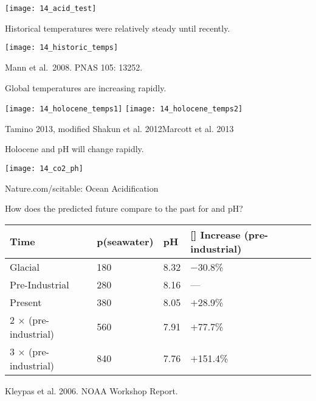 \documentclass[t,handout]{beamer}  %
\begin{document}

{
\begin{frame}
  \texttt{[image: 14\_acid\_test]}
\end{frame}
}
\begin{frame}[t]{Historical temperatures were relatively steady until recently.}

	\vspace{-\baselineskip}

	{\centering
	\texttt{[image: 14\_historic\_temps]}\par}
	
	\vfilll
	
	\tiny \hfill Mann et al.~2008. PNAS 105: 13252.  
	
\end{frame}
%
\begin{frame}[t]{Global temperatures are increasing rapidly.}
	
	\texttt{[image: 14\_holocene\_temps1]}
	\hfill
	\texttt{[image: 14\_holocene\_temps2]}

	\vfilll

	\tiny Tamino 2013, modified Shakun et al. 2012\hfill Marcott et al. 2013
	
\end{frame}
%
\begin{frame}[b]{Holocene  and pH will change rapidly.}

	\texttt{[image: 14\_co2\_ph]}
	
	\vfilll

	\hfill\tiny Nature.com/scitable: Ocean Acidification
	
\end{frame}
%
\begin{frame}[t]{How does the predicted future compare to the past for  and pH?}

	{\centering\lining\begin{tabular}{@{}L{25mm}C{20mm}C{10mm}R{25mm}@{}}
		\toprule
		Time	&	p\newline (seawater) &	pH	&	[] Increase (pre-industrial) \\
		\midrule
		Glacial	&	180	& 8.32	&	$-$30.8\% \\[1ex]
		Pre-Industrial	&	280	&	8.16	&	— \\[1ex]
		Present	&	380	&	8.05	&	$+$28.9\% \\[1ex]
		2 $\times$  (pre-industrial)	&	560	&	7.91	&	$+$77.7\% \\[1ex]
		3 $\times$  (pre-industrial) & 	840	& 7.76 & $+$151.4\% \\[1ex]
		\bottomrule
	\end{tabular}\par
	}

	\hangpara {} 
	\vfilll

	\hfill \tiny Kleypas et al. 2006. NOAA Workshop Report.

\end{frame}
%
\end{document}
